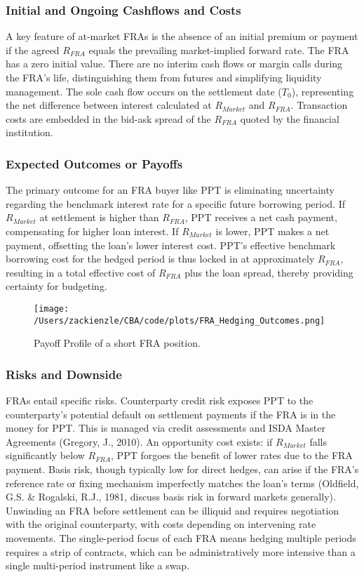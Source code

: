 \documentclass[11pt, a4paper, british]{article}
\begin{document}
\subsubsection{Initial and Ongoing Cashflows and Costs}
A key feature of at-market FRAs is the absence of an initial premium or payment if the agreed $R_{FRA}$ equals the prevailing market-implied forward rate. The FRA has a zero initial value. There are no interim cash flows or margin calls during the FRA's life, distinguishing them from futures and simplifying liquidity management. The sole cash flow occurs on the settlement date ($T_0$), representing the net difference between interest calculated at $R_{Market}$ and $R_{FRA}$. Transaction costs are embedded in the bid-ask spread of the $R_{FRA}$ quoted by the financial institution.

\subsubsection{Expected Outcomes or Payoffs}
The primary outcome for an FRA buyer like PPT is eliminating uncertainty regarding the benchmark interest rate for a specific future borrowing period. If $R_{Market}$ at settlement is higher than $R_{FRA}$, PPT receives a net cash payment, compensating for higher loan interest. If $R_{Market}$ is lower, PPT makes a net payment, offsetting the loan's lower interest cost. PPT's effective benchmark borrowing cost for the hedged period is thus locked in at approximately $R_{FRA}$, resulting in a total effective cost of $R_{FRA}$ plus the loan spread, thereby providing certainty for budgeting.

\begin{figure}[H]
 \centering
 \texttt{[image: /Users/zackienzle/CBA/code/plots/FRA\_Hedging\_Outcomes.png]} 
 \caption{Payoff Profile of a short FRA position.}
    \label{fig:fra_hedging_outcomes}
\end{figure}

\subsubsection{Risks and Downside}
FRAs entail specific risks. Counterparty credit risk exposes PPT to the counterparty's potential default on settlement payments if the FRA is in the money for PPT. This is managed via credit assessments and ISDA Master Agreements (Gregory, J., 2010). An opportunity cost exists: if $R_{Market}$ falls significantly below $R_{FRA}$, PPT forgoes the benefit of lower rates due to the FRA payment. Basis risk, though typically low for direct hedges, can arise if the FRA's reference rate or fixing mechanism imperfectly matches the loan's terms (Oldfield, G.S. \& Rogalski, R.J., 1981, discuss basis risk in forward markets generally). Unwinding an FRA before settlement can be illiquid and requires negotiation with the original counterparty, with costs depending on intervening rate movements. The single-period focus of each FRA means hedging multiple periods requires a strip of contracts, which can be administratively more intensive than a single multi-period instrument like a swap.
\end{document}
